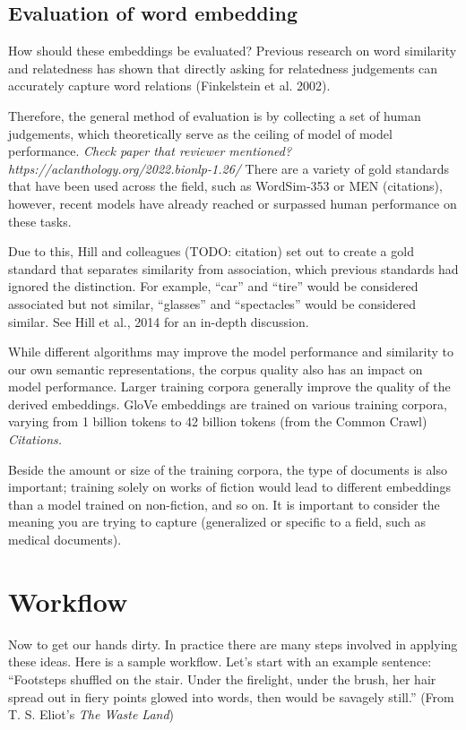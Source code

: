 \subsection{Evaluation of word embedding}

How should these embeddings be evaluated? Previous research on word similarity and relatedness has shown that directly asking for relatedness judgements can accurately capture word relations (Finkelstein et al. 2002).

Therefore, the general method of evaluation is by collecting a set of human judgements, which theoretically serve as the ceiling of model of model performance. \textit{Check paper that reviewer mentioned? https://aclanthology.org/2022.bionlp-1.26/}
There are a variety of gold standards that have been used across the field, such as WordSim-353 or MEN (citations), however, recent models have already reached or surpassed human performance on these tasks.

Due to this, Hill and colleagues (TODO: citation) set out to create a gold standard that separates similarity from association, which previous standards had ignored the distinction.
For example, ``car'' and ``tire'' would be considered associated but not similar, ``glasses'' and ``spectacles'' would be considered similar. See Hill et al., 2014 for an in-depth discussion.

While different algorithms may improve the model performance and similarity to our own semantic representations, the corpus quality also has an impact on model performance.
Larger training corpora generally improve the quality of the derived embeddings. 
GloVe embeddings are trained on various training corpora, varying from 1 billion tokens to 42 billion tokens (from the Common Crawl) \textit{Citations.}

Beside the amount or size of the training corpora, the type of documents is also important; training solely on works of fiction would lead to different embeddings than a model trained on non-fiction, and so on. It is important to consider the meaning you are trying to capture (generalized or specific to a field, such as medical documents).

\section{Workflow}

Now to get our hands dirty. In practice there are many steps involved in applying these ideas. 
Here is a sample workflow. Let's start with an example sentence: ``Footsteps shuffled on the stair. Under the firelight, under the brush, her hair spread out in fiery points glowed into words, then would be savagely still.'' (From T. S. Eliot's \textit{The Waste Land})

